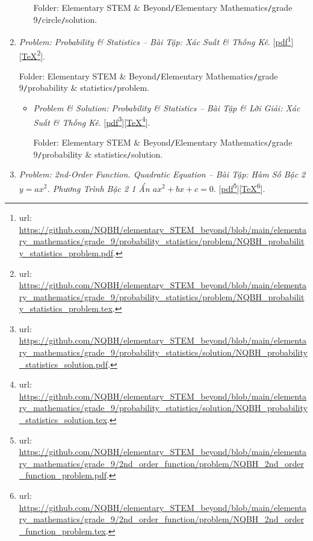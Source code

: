 \documentclass[12pt,twoside]{book}
\begin{document}
\begin{enumerate}
\begin{itemize}
		Folder: {\sf Elementary STEM \& Beyond{\tt/}Elementary Mathematics{\tt/}grade 9{\tt/}circle{\tt/}solution}.
	\end{itemize}
	\item {\it Problem: Probability \& Statistics -- Bài Tập: Xác Suất \& Thống Kê}. [\href{https://github.com/NQBH/elementary_STEM_beyond/blob/main/elementary_mathematics/grade_9/probability_statistics/problem/NQBH_probability_statistics_problem.pdf}{pdf}\footnote{{\sc url}: \url{https://github.com/NQBH/elementary_STEM_beyond/blob/main/elementary_mathematics/grade_9/probability_statistics/problem/NQBH_probability_statistics_problem.pdf}.}][\href{https://github.com/NQBH/elementary_STEM_beyond/blob/main/elementary_mathematics/grade_9/probability_statistics/problem/NQBH_probability_statistics_problem.tex}{\TeX}\footnote{{\sc url}: \url{https://github.com/NQBH/elementary_STEM_beyond/blob/main/elementary_mathematics/grade_9/probability_statistics/problem/NQBH_probability_statistics_problem.tex}.}].
	
	Folder: {\sf Elementary STEM \& Beyond{\tt/}Elementary Mathematics{\tt/}grade 9{\tt/}probability \& statistics{\tt/}problem}.
	\begin{itemize}
		\item {\it Problem \& Solution: Probability \& Statistics -- Bài Tập \& Lời Giải: Xác Suất \& Thống Kê}. [\href{https://github.com/NQBH/elementary_STEM_beyond/blob/main/elementary_mathematics/grade_9/probability_statistics/solution/NQBH_probability_statistics_solution.pdf}{pdf}\footnote{{\sc url}: \url{https://github.com/NQBH/elementary_STEM_beyond/blob/main/elementary_mathematics/grade_9/probability_statistics/solution/NQBH_probability_statistics_solution.pdf}.}][\href{https://github.com/NQBH/elementary_STEM_beyond/blob/main/elementary_mathematics/grade_9/probability_statistics/solution/NQBH_probability_statistics_solution.tex}{\TeX}\footnote{{\sc url}: \url{https://github.com/NQBH/elementary_STEM_beyond/blob/main/elementary_mathematics/grade_9/probability_statistics/solution/NQBH_probability_statistics_solution.tex}.}].
		
		Folder: {\sf Elementary STEM \& Beyond{\tt/}Elementary Mathematics{\tt/}grade 9{\tt/}probability \& statistics{\tt/}solution}.
	\end{itemize}
	\item {\it Problem: 2nd-Order Function. Quadratic Equation -- Bài Tập: Hàm Số Bậc 2 $y = ax^2$. Phương Trình Bậc 2 1 Ẩn $ax^2 + bx + c = 0$}. [\href{https://github.com/NQBH/elementary_STEM_beyond/blob/main/elementary_mathematics/grade_9/2nd_order_function/problem/NQBH_2nd_order_function_problem.pdf}{pdf}\footnote{{\sc url}: \url{https://github.com/NQBH/elementary_STEM_beyond/blob/main/elementary_mathematics/grade_9/2nd_order_function/problem/NQBH_2nd_order_function_problem.pdf}.}][\href{https://github.com/NQBH/elementary_STEM_beyond/blob/main/elementary_mathematics/grade_9/2nd_order_function/problem/NQBH_2nd_order_function_problem.tex}{\TeX}\footnote{{\sc url}: \url{https://github.com/NQBH/elementary_STEM_beyond/blob/main/elementary_mathematics/grade_9/2nd_order_function/problem/NQBH_2nd_order_function_problem.tex}.}].
	

\end{enumerate}
\end{document}
